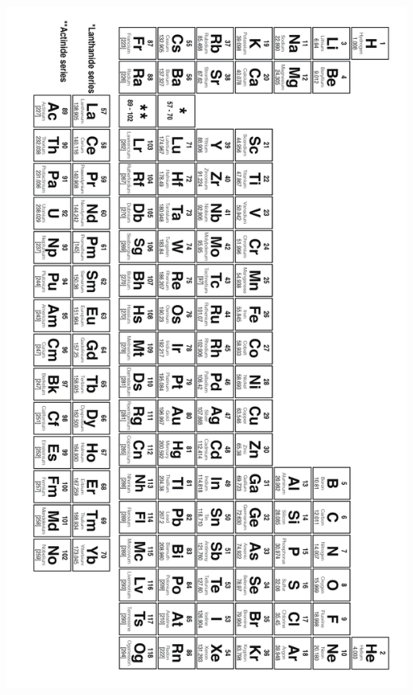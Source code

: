 \newpage
\includegraphics[]{figures/Periodic_Table_Of_Elements_Atomic_Mass_Black_And_White.jpg}
\restoregeometry
\newpage